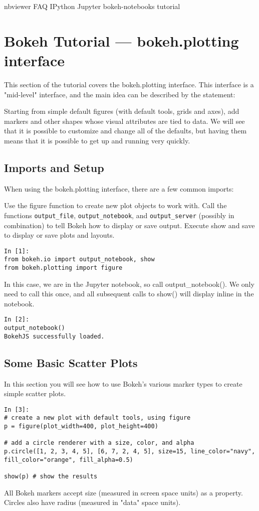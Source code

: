 nbviewer
FAQ
IPython
Jupyter
bokeh-notebooks   tutorial
 	
\section{Bokeh Tutorial — bokeh.plotting interface}
This section of the tutorial covers the bokeh.plotting interface. This interface is a "mid-level" interface, and the main idea can be described by the statement:

Starting from simple default figures (with default tools, grids and axes), add markers and other shapes whose visual attributes are tied to data.
We will see that it is possible to customize and change all of the defaults, but having them means that it is possible to get up and running very quickly.

\subsection{Imports and Setup}
When using the bokeh.plotting interface, there are a few common imports:

Use the figure function to create new plot objects to work with.
Call the functions \texttt{output\_file}, \texttt{output\_notebook}, and \texttt{output\_server} (possibly in combination) to tell Bokeh how to display or save output.
Execute show and save to display or save plots and layouts.

\begin{framed}
\begin{verbatim}
In [1]:
from bokeh.io import output_notebook, show
from bokeh.plotting import figure
\end{verbatim}
\end{framed}
In this case, we are in the Jupyter notebook, so call output_notebook(). We only need to call this once, and all subsequent calls to show() will display inline in the notebook.
\begin{framed}
	\begin{verbatim}
In [2]:
output_notebook()
BokehJS successfully loaded.
\end{verbatim}
\end{framed}
\subsection{Some Basic Scatter Plots}
In this section you will see how to use Bokeh's various marker types to create simple scatter plots.
\begin{framed}
	\begin{verbatim}
In [3]:
# create a new plot with default tools, using figure
p = figure(plot_width=400, plot_height=400)

# add a circle renderer with a size, color, and alpha
p.circle([1, 2, 3, 4, 5], [6, 7, 2, 4, 5], size=15, line_color="navy", fill_color="orange", fill_alpha=0.5)

show(p) # show the results
\end{verbatim}
\end{framed}
All Bokeh markers accept size (measured in screen space units) as a property. Circles also have radius (measured in "data" space units).

